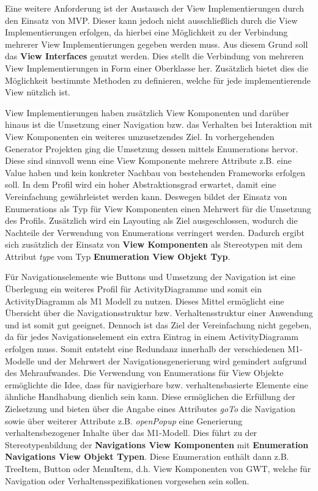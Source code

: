 Eine weitere Anforderung ist der Austausch der View Implementierungen durch den
Einsatz von MVP. Dieser kann jedoch nicht ausschließlich durch die View
Implementierungen erfolgen, da hierbei eine Möglichkeit zu der
Verbindung mehrerer View Implementierungen gegeben werden muss. Aus diesem Grund
soll das \textbf{View Interfaces} genutzt werden. Dies stellt die Verbindung von mehreren
View Implementierungen in Form einer Oberklasse her. Zusätzlich bietet dies die
Möglichkeit bestimmte Methoden zu definieren, welche für jede implementierende
View nützlich ist. 

View Implementierungen haben zusätzlich View Komponenten und darüber hinaus ist
die Umsetzung einer Navigation bzw. das Verhalten bei Interaktion mit
View Komponenten ein weiteres umzusetzendes Ziel. In vorhergehenden Generator
Projekten ging die Umsetzung dessen mittels Enumerations hervor. Diese sind
sinnvoll wenn eine View Komponente mehrere Attribute z.B. eine Value haben
und kein konkreter Nachbau von bestehenden Frameworks erfolgen soll. In dem Profil
wird ein hoher Abstraktionsgrad erwartet, damit eine Vereinfachung gewährleistet
werden kann. Deswegen bildet der Einsatz von Enumerations als Typ für
View Komponenten einen Mehrwert für die Umsetzung des Profils. Zusätzlich wird ein Layouting als
Ziel ausgeschlossen, wodurch die Nachteile der Verwendung von Enumerations
verringert werden. Dadurch ergibt sich zusätzlich der Einsatz von \textbf{View
Komponenten} als Stereotypen mit dem Attribut \textit{type} vom Typ
\textbf{Enumeration View Objekt Typ}.

Für Navigationselemente wie Buttons und Umsetzung der Navigation ist eine
Überlegung ein weiteres Profil für ActivityDiagramme und somit ein
ActivityDiagramm als M1 Modell zu nutzen. Dieses Mittel ermöglicht eine
Übersicht über die Navigationsstruktur bzw. Verhaltensstruktur einer Anwendung
und ist somit gut geeignet. Dennoch ist das Ziel der Vereinfachung nicht
gegeben, da für jedes Navigationselement ein extra Eintrag in einem
ActivityDiagramm erfolgen muss. Somit entsteht eine Redundanz innerhalb der
verschiedenen M1-Modelle und der Mehrwert der Navigationsgenerierung wird
gemindert aufgrund des Mehraufwandes. Die Verwendung von Enumerations für View
Objekte ermöglichte die Idee, dass für navigierbare bzw. verhaltensbasierte Elemente
eine ähnliche Handhabung dienlich sein kann. Diese ermöglichen die Erfüllung der
Zielsetzung und bieten über die Angabe eines Attributes \textit{goTo} die
Navigation sowie über weiterer Attribute z.B. \textit{openPopup} eine
Generierung verhaltensbezogener Inhalte über das M1-Modell. Dies führt zu der
Stereotypenbildung der \textbf{Navigations View Komponenten} mit
\textbf{Enumeration Navigations View Objekt Typen}. Diese Enumeration enthält
dann z.B. TreeItem, Button oder MenuItem, d.h. View Komponenten von GWT, welche
für Navigation oder Verhaltensspezifikationen vorgesehen sein sollen.

